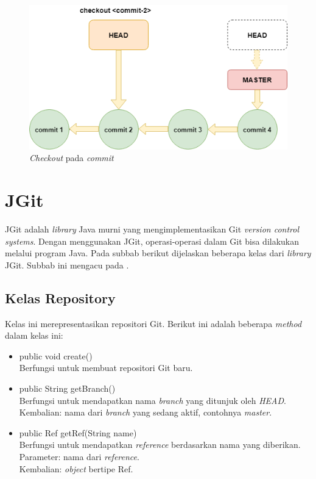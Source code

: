  
\begin{figure}[H]
	\centering
		\includegraphics[scale=0.6]{Gambar/gitcheckoutcommit.png}
	\caption{\textit{Checkout} pada \textit{commit}}
	\label{fig:git_checkout}
\end{figure}

\section{JGit}
\label{sec:jgit}
JGit adalah \textit{library} Java murni yang mengimplementasikan Git \textit{version control systems}\cite{JGit}. Dengan menggunakan JGit, operasi-operasi dalam Git bisa dilakukan melalui program Java. Pada subbab berikut dijelaskan beberapa kelas dari \textit{library} JGit. Subbab ini mengacu pada \cite{JGit_java_doc}. 

\subsection{Kelas Repository}
\label{subsec:repository}
Kelas ini merepresentasikan repositori Git. Berikut ini adalah beberapa \textit{method} dalam kelas ini:
\begin{itemize}
\item public void create()\\
Berfungsi untuk membuat repositori Git baru. 
\item public String getBranch()\\
Berfungsi untuk mendapatkan nama \textit{branch} yang ditunjuk oleh \textit{HEAD}.\\
Kembalian: nama dari \textit{branch} yang sedang aktif, contohnya \textit{master}.
\item public Ref getRef(String name)\\
Berfungsi untuk mendapatkan \textit{reference} berdasarkan nama yang diberikan.\\
Parameter: nama dari \textit{reference}.\\
Kembalian: \textit{object} bertipe Ref.
\end{itemize} 

